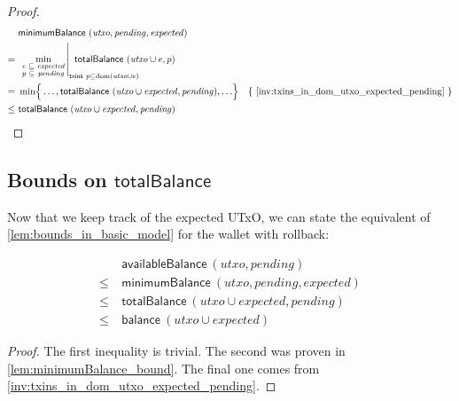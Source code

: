\documentclass{article}
\DeclareMathOperator{\dom}{dom}
\DeclareMathOperator*{\minimum}{min}
\theoremstyle{definition}{
  \newtheorem{lemma}{Lemma}[section] %
  \newtheorem{definition}[lemma]{Definition}
}
\theoremstyle{theorem}{
  \newtheorem{invariant}[lemma]{Invariant}
  \newtheorem{proofobligation}[lemma]{Proof Obligation}
}
\numberwithin{equation}{lemma}
\begin{document}
\begin{proof}
\begin{align*}
    & ~ \mathsf{minimumBalance} ~ (\mathit{utxo}, \mathit{pending}, \mathit{expected}) \\
=   & ~ \left.
        \minimum_{\begin{smallmatrix}
                    e & \sqsubseteq & \mathit{expected} \\
                    p & \subseteq   & \mathit{pending}
                  \end{smallmatrix}}
        \right|_{\mathrlap{\mathsf{txins} ~ p \subseteq \dom(\mathit{utxo} \cup e)}}
        ~ \mathsf{totalBalance} ~ (\mathit{utxo} \cup e, p) \\
=   & ~ \minimum \Bigr\{ \ldots, \mathsf{totalBalance} ~ (\mathit{utxo} \cup \mathit{expected}, \mathit{pending}), \ldots \Bigr\}
    & \text{\{ \cref{inv:txins_in_dom_utxo_expected_pending} \}} \\
\le & ~ \mathsf{totalBalance} ~ (\mathit{utxo} \cup \mathit{expected}, \mathit{pending})
\end{align*}
\end{proof}

\subsection{Bounds on $\mathsf{totalBalance}$}

Now that we keep track of the expected UTxO, we can state the equivalent
of \cref{lem:bounds_in_basic_model} for the wallet with rollback:

\begin{lemma}
\begin{align*}
    & ~ \mathsf{availableBalance} ~ (\mathit{utxo}, \mathit{pending}) \\
\le & ~ \mathsf{minimumBalance} ~ (\mathit{utxo}, \mathit{pending}, \mathit{expected}) \\
\le & ~ \mathsf{totalBalance} ~ (\mathit{utxo} \cup \mathit{expected}, \mathit{pending}) \\
\le & ~ \mathsf{balance} ~ (\mathit{utxo} \cup \mathit{expected})
\end{align*}
\label{lem:bounds_in_rollback_model}
\end{lemma}

\begin{proof}
The first inequality is trivial. The second was proven in
\cref{lem:minimumBalance_bound}. The final one comes from
\cref{inv:txins_in_dom_utxo_expected_pending}.
\end{proof}
\end{document}
